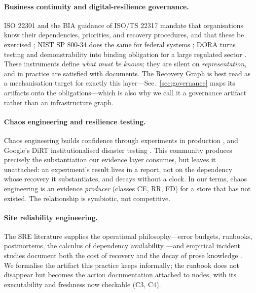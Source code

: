 \paragraph{Business continuity and digital-resilience governance.}
ISO 22301 and the BIA guidance of ISO/TS 22317 mandate that organisations know their dependencies, priorities, and recovery procedures, and that these be exercised \citep{iso22301,iso22317}; NIST SP 800-34 does the same for federal systems \citep{nist2010contingency}; DORA turns testing and demonstrability into binding obligation for a large regulated sector \citep{eu2022dora}. These instruments define \emph{what must be known}; they are silent on \emph{representation}, and in practice are satisfied with documents. The Recovery Graph is best read as a mechanisation target for exactly this layer---Sec.~\ref{sec:governance} maps its artifacts onto the obligations---which is also why we call it a governance artifact rather than an infrastructure graph.

\paragraph{Chaos engineering and resilience testing.}
Chaos engineering builds confidence through experiments in production \citep{basiri2016chaos,rosenthal2020chaos}, and Google's DiRT institutionalised disaster testing \citep{krishnan2012weathering}. This community produces precisely the substantiation our evidence layer consumes, but leaves it unattached: an experiment's result lives in a report, not on the dependency whose recovery it substantiates, and decays without a clock. In our terms, chaos engineering is an evidence \emph{producer} (classes CE, RR, FD) for a store that has not existed. The relationship is symbiotic, not competitive.

\paragraph{Site reliability engineering.}
The SRE literature supplies the operational philosophy---error budgets, runbooks, postmortems, the calculus of dependency availability \citep{beyer2016sre,treynor2017calculus,adkins2020secure}---and empirical incident studies document both the cost of recovery and the decay of prose knowledge \citep{gunawi2016cloud,ghosh2022fight,chen2020incident,dang2019aiops}. We formalise the artifact this practice keeps informally; the runbook does not disappear but becomes the action documentation attached to nodes, with its executability and freshness now checkable (C3, C4).

